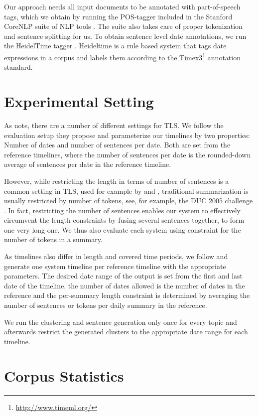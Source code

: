 \documentclass[a4paper,BCOR=10mm]{report}
\numberwithin{lemma}{chapter}
\numberwithin{definition}{chapter}
\begin{document}
Our approach needs all input documents to be annotated with part-of-speech tags, which we obtain by running the POS-tagger included in the Stanford CoreNLP suite of NLP tools \citep{stanford-corenlp}. The suite also takes care of proper tokenization and sentence splitting for us.
To obtain sentence level date annotations, we run the HeidelTime tagger \citet{heideltime}. Heideltime is a rule based system that tags date expressions in a corpus and labels them according to the Timex3\footnote{\url{http://www.timeml.org/}} annotation standard.

\section{Experimental Setting}

As \citet{markert} note, there are a number of different settings for TLS.
We follow the evaluation setup they propose and parameterize our timelines by two properties: Number of dates and number of sentences per date. Both are set from the reference timelines, where the number of sentences per date is the rounded-down average of sentences per date in the reference timeline.

However, while restricting the length in terms of number of sentences is a common setting in TLS, used for example by \citet{chieu} and \citet{yan-trans}, traditional summarization is usually restricted by number of tokens, see, for example, the DUC 2005 challenge \citep{duc2005}. In fact, restricting the number of sentences enables our system to effectively circumvent the length constraints by fusing several sentences together, to form one very long one.
We thus also evaluate each system using constraint for the number of tokens in a summary.

As timelines also differ in length and covered time periods, we follow \citet{markert} and generate one system timeline per reference timeline with the appropriate parameters. The desired date range of the output is set from the first and last date of the timeline, the number of dates allowed is the number of dates in the reference and the per-summary length constraint is determined by averaging the number of sentences or tokens per daily summary in the reference.

We run the clustering and sentence generation only once for every topic and afterwards restrict the generated clusters to the appropriate date range for each timeline.


\section{Corpus Statistics} \label{sec:setup-stats}
\end{document}
